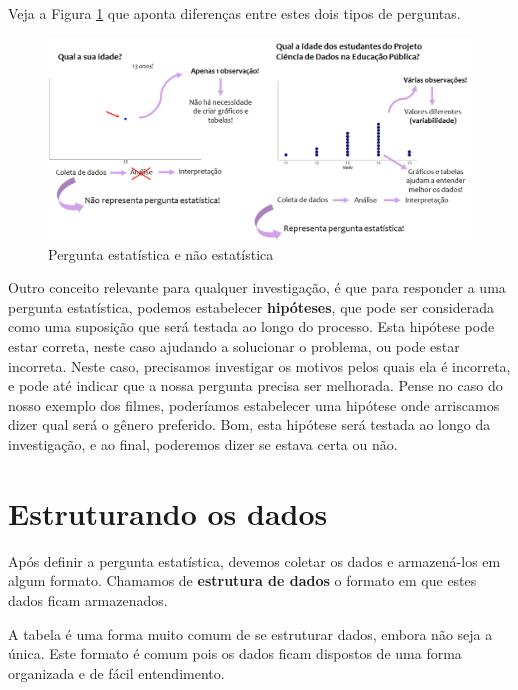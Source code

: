 \documentclass[
  portuguese,
  oneside]{book}
\begin{document}
Veja a Figura \ref{fig:figura7} que aponta diferenças entre estes dois tipos de perguntas.

\begin{figure}

{\centering \includegraphics[width=1\linewidth]{fig_cap1/idades_paint} 

}

\caption{Pergunta estatística e não estatística}\label{fig:figura7}
\end{figure}

Outro conceito relevante para qualquer investigação, é que para responder a uma pergunta estatística, podemos estabelecer \textbf{hipóteses}, que pode ser considerada como uma suposição que será testada ao longo do processo. Esta hipótese pode estar correta, neste caso ajudando a solucionar o problema, ou pode estar incorreta. Neste caso, precisamos investigar os motivos pelos quais ela é incorreta, e pode até indicar que a nossa pergunta precisa ser melhorada. Pense no caso do nosso exemplo dos filmes, poderíamos estabelecer uma hipótese onde arriscamos dizer qual será o gênero preferido. Bom, esta hipótese será testada ao longo da investigação, e ao final, poderemos dizer se estava certa ou não.

\hypertarget{estruturando-os-dados}{%
\section{Estruturando os dados}\label{estruturando-os-dados}}

Após definir a pergunta estatística, devemos coletar os dados e armazená-los em algum formato. Chamamos de \textbf{estrutura de dados} o formato em que estes dados ficam armazenados.

A tabela é uma forma muito comum de se estruturar dados, embora não seja a única. Este formato é comum pois os dados ficam dispostos de uma forma organizada e de fácil entendimento.
\end{document}
